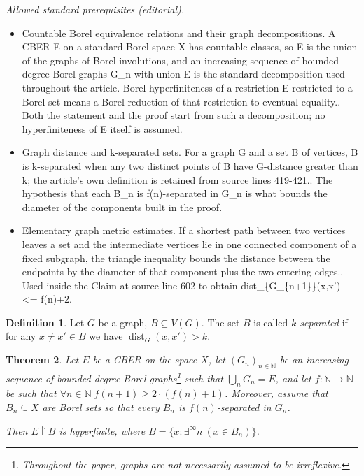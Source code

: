 \documentclass[11pt]{amsart}
\newcommand{\N}{\mathbb{N}}
\renewcommand{\restriction}[2]{#1 \upharpoonright #2}
\newtheorem{theorem}{Theorem}[section]
\theoremstyle{definition}
\newtheorem{definition}[theorem]{Definition}
\numberwithin{equation}{section}
\DeclareMathOperator{\dist}{dist}
\begin{document}
\noindent\textit{Allowed standard prerequisites (editorial).}\begin{itemize}
\item Countable Borel equivalence relations and their graph decompositions. A CBER E on a standard Borel space X has countable classes, so E is the union of the graphs of Borel involutions, and an increasing sequence of bounded-degree Borel graphs G\_n with union E is the standard decomposition used throughout the article. Borel hyperfiniteness of a restriction E restricted to a Borel set means a Borel reduction of that restriction to eventual equality.. Both the statement and the proof start from such a decomposition; no hyperfiniteness of E itself is assumed.
\item Graph distance and k-separated sets. For a graph G and a set B of vertices, B is k-separated when any two distinct points of B have G-distance greater than k; the article's own definition is retained from source lines 419-421.. The hypothesis that each B\_n is f(n)-separated in G\_n is what bounds the diameter of the components built in the proof.
\item Elementary graph metric estimates. If a shortest path between two vertices leaves a set and the intermediate vertices lie in one connected component of a fixed subgraph, the triangle inequality bounds the distance between the endpoints by the diameter of that component plus the two entering edges.. Used inside the Claim at source line 602 to obtain dist\_\{G\_\{n+1\}\}(x,x') <= f(n)+2.
\end{itemize}\medskip
	\begin{definition}
		Let $G$ be a graph, $B \subseteq V(G)$. The set $B$ is called \emph{$k$-separated} if for any $x \neq x' \in B$ we have $\dist_{G}(x,x')>k$.
	\end{definition}

	\begin{theorem}
		\label{t:separation2}
		Let $E$ be a CBER on the space $X$, let $(G_n)_{n \in \N}$ be an increasing sequence of bounded degree Borel graphs\footnote{Throughout the paper, graphs are not necessarily assumed to be irreflexive.} such that $\bigcup_n G_n=E$, and let $f:\N\to\N$ be such that $\forall n\in\N\; f(n+1)\ge2\cdot(f(n)+1)$. Moreover, assume that $B_n \subseteq X$ are Borel sets so that every $B_n$ is $f(n)$-separated in $G_n$. 
		
		Then $\restriction{E}{B}$ is hyperfinite, where $B=\{x:\exists^\infty n \ (x \in B_n)\}$.
	\end{theorem}
\end{document}
